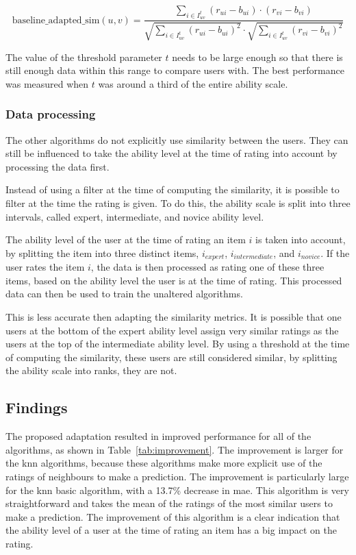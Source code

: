 \begin{equation}
  \label{eq:baseline-adapted}
        \text{baseline\_adapted\_sim}(u, v) = \frac{
            \sum\limits_{i \in I_{uv}^t} (r_{ui} -  b_{ui}) \cdot (r_{vi} -
            b_{vi})} {\sqrt{\sum\limits_{i \in I_{uv}^t} (r_{ui} -  b_{ui})^2}
            \cdot \sqrt{\sum\limits_{i \in I_{uv}^t} (r_{vi} -  b_{vi})^2}}
\end{equation}

The value of the threshold parameter $t$ needs to be large enough so that there is still enough data within this range to compare users with.
The best performance was measured when $t$ was around a third of the entire ability scale.

\subsubsection{Data processing}
The other algorithms do not explicitly use similarity between the users.
They can still be influenced to take the ability level at the time of rating into account by processing the data first.

Instead of using a filter at the time of computing the similarity, it is possible to filter at the time the rating is given.
To do this, the ability scale is split into three intervals, called expert, intermediate, and novice ability level.

The ability level of the user at the time of rating an item $i$ is taken into account, by splitting the item into three distinct items, $i_{expert}$, $i_{intermediate}$, and $i_{novice}$.
If the user rates the item $i$, the data is then processed as rating one of these three items, based on the ability level the user is at the time of rating.
This processed data can then be used to train the unaltered algorithms.

This is less accurate then adapting the similarity metrics. It is possible that one users at the bottom of the expert ability level assign very similar ratings as the users at the top of the intermediate ability level. 
By using a threshold at the time of computing the similarity, these users are still considered similar, by splitting the ability scale into ranks, they are not.

\subsection{Findings}
The proposed adaptation resulted in improved performance for all of the algorithms, as shown in Table~\ref{tab:improvement}.
The improvement is larger for the \gls{knn} algorithms, because these algorithms make more explicit use of the ratings of neighbours to make a prediction.
The improvement is particularly large for the \gls{knn} basic algorithm, with a 13.7\% decrease in \gls{mae}.
This algorithm is very straightforward and takes the mean of the ratings of the most similar users to make a prediction.
The improvement of this algorithm is a clear indication that the ability level of a user at the time of rating an item has a big impact on the rating.

